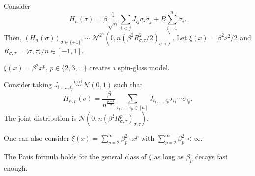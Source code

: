 Consider
\[
	H_n(\sigma )
	= \beta \frac{1}{\sqrt{n} } \sum_{i < j} J_{ij} \sigma _i \sigma _j + B \sum_{i=1}^{n} \sigma _i .
\]
Then, \((H_n(\sigma ))_{\sigma \in \{ \pm 1 \} ^n} \sim \mathcal{N} ^{2^n}(0, n (\beta ^2 R_{\sigma , \tau }^2 / 2)_{\sigma , \tau })\). Let \(\xi (x) = \beta ^2 x^2 / 2\) and \(R_{\sigma , \tau } = \langle \sigma , \tau \rangle / n \in [-1, 1]\).

\begin{eg}
	\(\xi (x) = \beta ^2 x^p\), \(p \in \{ 2, 3, \dots \} \) creates a spin-glass model.
\end{eg}
\begin{explanation}
	Consider taking \(J_{i_1, \dots , i_p} \overset{\text{i.i.d.} }{\sim } \mathcal{N} (0, 1)\) such that
	\[
		H_{n, p}(\sigma )
		= \frac{\beta }{n^{\frac{p-1}{2}}} \sum_{i_1, \dots , i_p \in [n]} J_{i_1, \dots , i_p} \sigma _{i_1} \cdots \sigma _{i_p}.
	\]
	The joint distribution is \(\mathcal{N} (0, n (\beta ^2 R_{\sigma , \tau }^p)_{\sigma , \tau })\).
\end{explanation}

\begin{eg}
	One can also consider \(\xi (x) = \sum_{p=2}^{\infty} \beta _p^2 \cdot x^p\) with \(\sum_{p=2}^{\infty} \beta _p^2 < \infty \).
\end{eg}

\begin{theorem}[Informal]
	The Paris formula holds for the general class of \(\xi \) as long as \(\beta _p\) decays fast enough.
\end{theorem}